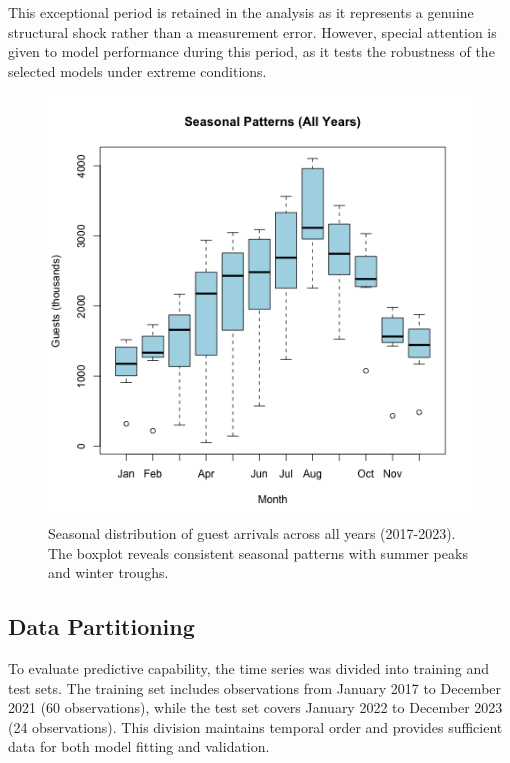 \documentclass[journal]{IEEEtran}
\begin{document}
This exceptional period is retained in the analysis as it represents a genuine structural shock rather than a measurement error. However, special attention is given to model performance during this period, as it tests the robustness of the selected models under extreme conditions.

\begin{figure}[h]
    \centering
    \includegraphics[width=1\linewidth]{plots/seasonal-patterns.png}
    \caption{Seasonal distribution of guest arrivals across all years (2017-2023). The boxplot reveals consistent seasonal patterns with summer peaks and winter troughs.}
    \label{fig:seasonal}
\end{figure}

\subsection{Data Partitioning}

To evaluate predictive capability, the time series was divided into training and test sets. The training set includes observations from January 2017 to December 2021 (60 observations), while the test set covers January 2022 to December 2023 (24 observations). This division maintains temporal order and provides sufficient data for both model fitting and validation.
\end{document}
